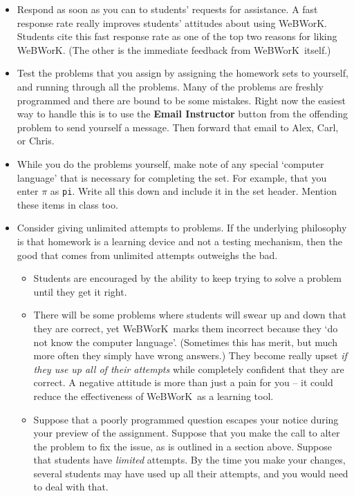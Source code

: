 \documentclass[12pt]{article}
\newcommand{\menu}[1]{\textbf{#1}}
\newcommand{\WW}{WeBWorK}
\begin{document}
\begin{itemize}
\item Respond as soon as you can to students' requests for assistance.  A fast response rate really improves students' attitudes about using \WW.  Students cite this fast response rate as one of the top two reasons for liking \WW.  (The other is the immediate feedback from \WW\ itself.)

\item Test the problems that you assign by assigning the homework sets to yourself, and running through all the problems.  Many of the problems are freshly programmed and there are bound to be some mistakes.  Right now the easiest way to handle this is to use the \menu{Email Instructor} button from the offending problem to send yourself a message. Then forward that email to Alex, Carl, or Chris.

\item While you do the problems yourself, make note of any special `computer language' that is necessary for completing the set.  For example, that you enter $\pi$ as \texttt{pi}.  Write all this down and include it in the set header.  Mention these items in class too.
  
\item Consider giving unlimited attempts to problems.  If the underlying philosophy is that homework is a learning device and not a testing mechanism, then the good that comes from unlimited attempts outweighs the bad.
\begin{itemize}
\item Students are encouraged by the ability to keep trying to solve a problem until they get it right. 

\item There will be some problems where students will swear up and down that they are correct, yet \WW\ marks them incorrect because they `do not know the computer language'.  (Sometimes this has merit, but much more often they simply have wrong answers.)  They become really upset \emph{if they use up all of their attempts} while completely confident that they are correct.  A negative attitude is more than just a pain for you -- it could reduce the effectiveness of \WW\ as a learning tool.

\item Suppose that a poorly programmed question escapes your notice during your preview of the assignment.  Suppose that you make the call to alter the problem to fix the issue, as is outlined in a section above.  Suppose that students have \emph{limited} attempts.  By the time you make your changes, several students may have used up all their attempts, and you would need to deal with that.


\end{itemize}
\end{itemize}
\end{document}
